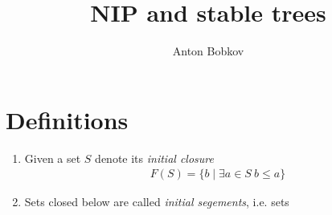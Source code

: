 \documentclass{amsart}
\begin{document}
\title{NIP and stable trees}
\author{Anton Bobkov}

\maketitle

\section{Definitions}

\begin{Definition}
	\begin{enumerate}
		\item Given a set $S$ denote its \emph{initial closure} 
		\begin{align*}
			F(S) = \{b \mid \exists a \in S \ b \leq a\}
		\end{align*}
		\item Sets closed below are called \emph{initial segements}, i.e. sets
	\end{enumerate}
\end{Definition}
\end{document}
